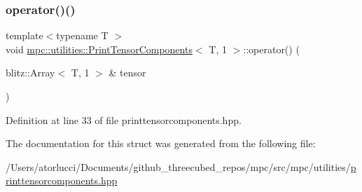 \subsubsection{\texorpdfstring{operator()()}{operator()()}}
{\footnotesize\ttfamily template$<$typename T $>$ \\
void \mbox{\hyperlink{structmpc_1_1utilities_1_1_print_tensor_components}{mpc\+::utilities\+::\+Print\+Tensor\+Components}}$<$ T, 1 $>$\+::operator() (\begin{DoxyParamCaption}\item[{blitz\+::\+Array$<$ T, 1 $>$ \&}]{tensor }\end{DoxyParamCaption})\hspace{0.3cm}{\ttfamily [inline]}}



Definition at line 33 of file printtensorcomponents.\+hpp.



The documentation for this struct was generated from the following file\+:\begin{DoxyCompactItemize}
\item 
/\+Users/atorlucci/\+Documents/github\+\_\+threecubed\+\_\+repos/mpc/src/mpc/utilities/\mbox{\hyperlink{printtensorcomponents_8hpp}{printtensorcomponents.\+hpp}}\end{DoxyCompactItemize}
